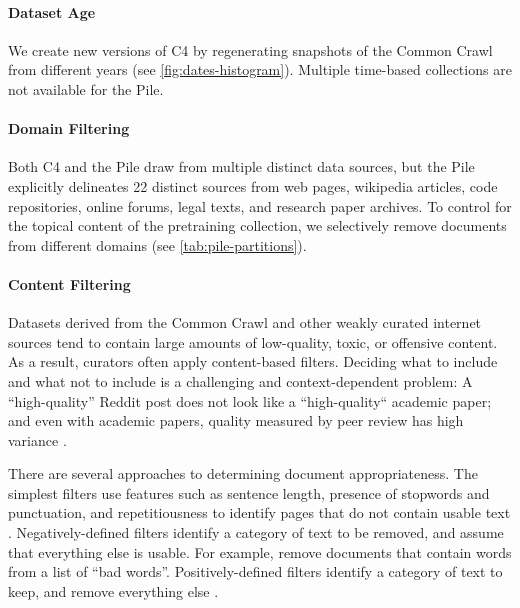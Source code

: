 \documentclass{article}
\begin{document}
\paragraph{Dataset Age}
We create new versions of C4 by regenerating snapshots of the Common Crawl from different years (see \cref{fig:dates-histogram}).
Multiple time-based collections are not available for the Pile. 

\vspace{-3mm}
\paragraph{Domain Filtering}
Both C4 and the Pile draw from multiple distinct data sources, but the Pile explicitly delineates 22 distinct sources from web pages, wikipedia articles, code repositories, online forums, legal texts, and research paper archives.
To control for the topical content of the pretraining collection, we selectively remove documents from different domains (see \cref{tab:pile-partitions}).

\vspace{-3mm}
\paragraph{Content Filtering}
Datasets derived from the Common Crawl and other weakly curated internet sources tend to contain large amounts of low-quality, toxic, or offensive content.
As a result, curators often apply content-based filters.
Deciding what to include and what not to include is a challenging and context-dependent problem: A ``high-quality'' Reddit post does not look like a ``high-quality`` academic paper; and even with academic papers, quality measured by peer review has high variance \citep{cortes2021inconsistency}.

There are several approaches to determining document appropriateness.
The simplest filters use features such as sentence length, presence of stopwords and punctuation, and repetitiousness to identify pages that do not contain usable text \citep{rae2021scaling,yang2019xlnet,laurenccon2022bigscience,zhang2022opt}.
Negatively-defined filters identify a category of text to be removed, and assume that everything else is usable.
For example, \citet{raffel2020exploring} remove documents that contain words from a list of ``bad words''.
Positively-defined filters identify a category of text to keep, and %
remove everything else \citep{du_glam_2021,touvron2023llama,brown2020language}.
\end{document}
